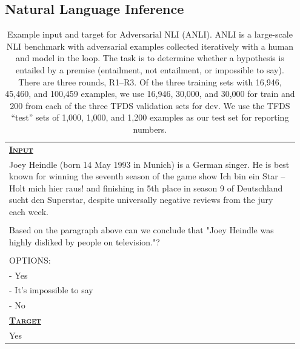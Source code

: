 \newcommand{\taskio}[3]{
    \begin{table}[h]
        \centering
        \begin{tabular}{ |p{0.95\linewidth}| } 
             \hline
             \vspace{-1mm} \textsc{\textbf{\underline{Input}}}  \\ 
             #1 \\
             \hline
             \vspace{-1mm} \textsc{\textbf{\underline{Target}}}  \\ 
             {#2} \\
             \hline
        \end{tabular}
        \caption{#3}
    \end{table}
}

\newcommand{\taskdescription}[8]{Example input and target for #1 (#2). #2 #3 #4. Of the #5, we use #6 for train and #7 for dev. We use #8 as our test set for reporting numbers.}

\clearpage 
\subsection{Natural Language Inference}\label{appen:b-nli}

\taskio
{Joey Heindle (born 14 May 1993 in Munich) is a German singer. He is best known for winning the seventh season of the game show Ich bin ein Star – Holt mich hier raus! and finishing in 5th place in season 9 of Deutschland sucht den Superstar, despite universally negative reviews from the jury each week.\\\\Based on the paragraph above can we conclude that "Joey Heindle was highly disliked by people on television."?\\\\OPTIONS:\\- Yes\\- It's impossible to say\\- No}
{Yes}
{   \taskdescription
    {Adversarial NLI} %
    {ANLI} %
    {\citep{anli}} %
    {is a large-scale NLI benchmark with adversarial examples collected iteratively with a human and model in the loop. The task is to determine whether a hypothesis is entailed by a premise (entailment, not entailment, or impossible to say). There are three rounds, R1--R3} %
    {three training sets with 16,946, 45,460, and 100,459 examples} %
    {16,946, 30,000, and 30,000} %
    {200 from each of the three TFDS validation sets} %
    {the TFDS ``test'' sets of 1,000, 1,000, and 1,200 examples} %
}

